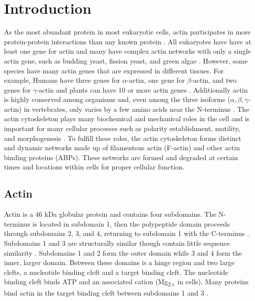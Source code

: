 
\chapter{Introduction}\label{ch:intro}
As the most abundant protein in most eukaryotic cells, actin participates in more protein-protein interactions than any known protein \citep{dominguez_actin_2011}. All eukaryotes have have at least one gene for actin and many have complex actin networks with only a single actin gene, such as budding yeast, fission yeast, and green algae \citep{pollard_actin_2016}. However, some species have many actin genes that are expressed in different tissues. For example, Humans have three genes for $\alpha$-actin, one gene for $\beta$-actin, and two genes for $\gamma$-actin and plants can have 10 or more actin genes \citep{pollard_actin_2016}. Additionally actin is highly conserved among organisms and, even among the three isoforms ($\alpha, \beta, \gamma$-actin) in vertebrates, only varies by a few amino acids near the N-terminus \citep{dominguez_actin_2011}. The actin cytoskeleton plays many biochemical and mechanical roles in the cell and is important for many cellular processes such as polarity establishment, motility, and morphogenesis \citep{blanchoin_actin_2014}. To fulfill these roles, the actin cytoskeleton forms distinct and dynamic networks made up of filamentous actin (F-actin) and other actin binding proteins (ABPs). These networks are formed and degraded at certain times and locations within cells for proper cellular function. 

\section{Actin}\label{actin-intro}

Actin is a 46 kDa globular protein and contains four subdomains. The N-terminus is located in subdomain 1, then the polypeptide domain proceeds through subdomains 2, 3, and 4, returning to subdomain 1 with the C-terminus \citep{pollard_actin_2016}. Subdomains 1 and 3 are structurally similar though contain little sequence similarity \citep{dominguez_actin_2009,pollard_actin_2016}. Subdomains 1 and 2 form the outer domain while 3 and 4 form the inner, larger domain. Between these domains is a hinge region and two large clefts, a nucleotide binding cleft and a target binding cleft. The nucleotide binding cleft binds ATP and an associated cation (Mg\textsubscript{2+} in cells). Many proteins bind actin in the target binding cleft between subdomains 1 and 3 \citep{dominguez_actin_2009}.

